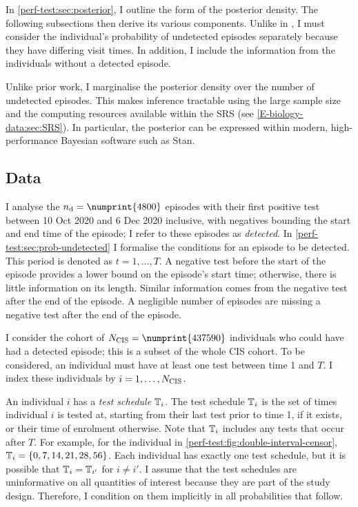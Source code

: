 \documentclass[thesis.tex]{subfiles}
\begin{document}
In \cref{perf-test:sec:posterior}, I outline the form of the posterior density.
The following subsections then derive its various components.
Unlike in \textcite{heiseyModelling}, I must consider the individual's probability of undetected episodes separately because they have differing visit times.
In addition, I include the information from the individuals without a detected episode.

Unlike prior work, I marginalise the posterior density over the number of undetected episodes.
This makes inference tractable using the large sample size and the computing resources available within the SRS (see \cref{E-biology-data:sec:SRS}).
In particular, the posterior can be expressed within modern, high-performance Bayesian software such as Stan.

\subsection{Data} \label{perf-test:sec:data}

I analyse the $\ndet = \numprint{4800}$ episodes with their first positive test between 10 Oct 2020 and 6 Dec 2020 inclusive, with negatives bounding the start and end time of the episode; I refer to these episodes as \emph{detected}.
In \cref{perf-test:sec:prob-undetected} I formalise the conditions for an episode to be detected.
This period is denoted as $t = 1, \dots, T$.
A negative test before the start of the episode provides a lower bound on the episode's start time; otherwise, there is little information on its length.
Similar information comes from the negative test after the end of the episode.
A negligible number of episodes are missing a negative test after the end of the episode.

I consider the cohort of $\Ncis = \numprint{437590}$ individuals who could have had a detected episode; this is a subset of the whole CIS cohort.
To be considered, an individual must have at least one test between time 1 and $T$.
I index these individuals by $i = 1, \dots, N_\text{CIS}$.

An individual $i$ has a \emph{test schedule} $\mathbb{T}_i$.
The test schedule $\mathbb{T}_i$ is the set of times individual $i$ is tested at, starting from their last test prior to time 1, if it exists, or their time of enrolment otherwise.
Note that $\mathbb{T}_i$ includes any tests that occur after $T$.
For example, for the individual in \cref{perf-test:fig:double-interval-censor}, $\mathbb{T}_i = \{ 0, 7, 14, 21, 28, 56 \}$.
Each individual has exactly one test schedule, but it is possible that $\mathbb{T}_i = \mathbb{T}_{i'}$ for $i \neq i'$.
I assume that the test schedules are uninformative on all quantities of interest because they are part of the study design.
Therefore, I condition on them implicitly in all probabilities that follow.
\end{document}
